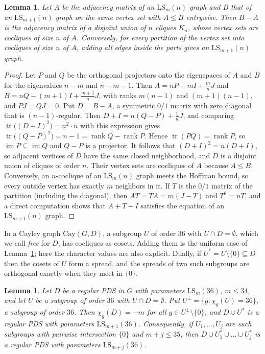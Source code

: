 \documentclass[11pt]{amsart}
\newtheorem{lemma}[theorem]{Lemma}
\theoremstyle{definition}
\newcommand{\Cay}{\mathrm{Cay}}
\newcommand{\LS}{\mathrm{LS}}
\begin{document}
\begin{lemma}\label{lem:completion}
Let $A$ be the adjacency matrix of an $\LS_m(n)$ graph and $B$ that of an $\LS_{m+1}(n)$ graph on the same vertex set with $A\le B$ entrywise. Then $B-A$ is the adjacency matrix of a disjoint union of $n$ cliques $K_n$, whose vertex sets are cocliques of size $n$ of $A$. Conversely, for every partition of the vertex set into cocliques of size $n$ of $A$, adding all edges inside the parts gives an $\LS_{m+1}(n)$ graph.
\end{lemma}

\begin{proof}
Let $P$ and $Q$ be the orthogonal projectors onto the eigenspaces of $A$ and $B$ for the eigenvalues $n-m$ and $n-m-1$. Then $A=nP-mI+\tfrac mnJ$ and $B=nQ-(m+1)I+\tfrac{m+1}{n}J$, with ranks $m(n-1)$ and $(m+1)(n-1)$, and $PJ=QJ=0$. Put $D=B-A$, a symmetric $0/1$ matrix with zero diagonal that is $(n-1)$-regular. Then $D+I=n(Q-P)+\tfrac1nJ$, and comparing $\operatorname{tr}\bigl((D+I)^2\bigr)=n^2\cdot n$ with this expression gives $\operatorname{tr}\bigl((Q-P)^2\bigr)=n-1=\operatorname{rank}Q-\operatorname{rank}P$. Hence $\operatorname{tr}(PQ)=\operatorname{rank}P$, so $\operatorname{im}P\subseteq\operatorname{im}Q$ and $Q-P$ is a projector. It follows that $(D+I)^2=n(D+I)$, so adjacent vertices of $D$ have the same closed neighborhood, and $D$ is a disjoint union of cliques of order $n$. Their vertex sets are cocliques of $A$ because $A\le B$. Conversely, an $n$-coclique of an $\LS_m(n)$ graph meets the Hoffman bound, so every outside vertex has exactly $m$ neighbors in it. If $T$ is the $0/1$ matrix of the partition (including the diagonal), then $AT=TA=m(J-T)$ and $T^2=nT$, and a direct computation shows that $A+T-I$ satisfies the equation of an $\LS_{m+1}(n)$ graph.
\end{proof}

In a Cayley graph $\Cay(G,D)$, a subgroup $U$ of order $36$ with $U\cap D=\emptyset$, which we call \emph{free} for $D$, has cocliques as cosets. Adding them is the uniform case of Lemma~\ref{lem:completion}; here the character values are also explicit. Dually, if $U^*=U\setminus\{0\}\subseteq D$ then the cosets of $U$ form a spread, and the spreads of two such subgroups are orthogonal exactly when they meet in $\{0\}$.

\begin{lemma}\label{lem:free}
Let $D$ be a regular PDS in $G$ with parameters $\LS_m(36)$, $m\le34$, and let $U$ be a subgroup of order $36$ with $U\cap D=\emptyset$. Put $U^\perp=\{g:\chi_g(U)=36\}$, a subgroup of order $36$. Then $\chi_g(D)=-m$ for all $g\in U^\perp\setminus\{0\}$, and $D\cup U^*$ is a regular PDS with parameters $\LS_{m+1}(36)$. Consequently, if $U_1,\dots,U_j$ are such subgroups with pairwise intersection $\{0\}$ and $m+j\le35$, then $D\cup U_1^*\cup\dots\cup U_j^*$ is a regular PDS with parameters $\LS_{m+j}(36)$.
\end{lemma}
\end{document}
